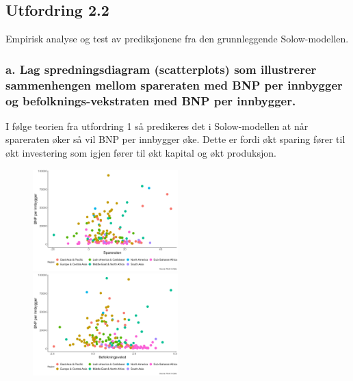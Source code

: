 \documentclass[
  12pt,
  a4paper,
  DIV=11,
  numbers=noendperiod]{scrartcl}
\begin{document}
\clearpage

\subsection{Utfordring 2.2}\label{utfordring-2.2}

Empirisk analyse og test av prediksjonene fra den grunnleggende
Solow-modellen.

\subsubsection{a. Lag spredningsdiagram (scatterplots) som illustrerer
sammenhengen mellom spareraten med BNP per innbygger og
befolknings-vekstraten med BNP per
innbygger.}\label{a.-lag-spredningsdiagram-scatterplots-som-illustrerer-sammenhengen-mellom-spareraten-med-bnp-per-innbygger-og-befolknings-vekstraten-med-bnp-per-innbygger.}

I følge teorien fra utfordring 1 så predikeres det i Solow-modellen at
når spareraten øker så vil BNP per innbygger øke. Dette er fordi økt
sparing fører til økt investering som igjen fører til økt kapital og økt
produksjon.

\begin{figure}
  \centering
  \includegraphics[width=0.5\textwidth]{dokumentobjekter/figurer/spareraten_bnp_per_innbygger.png}
  \label{fig:sparerate}
  \includegraphics[width=0.5\textwidth]{dokumentobjekter/figurer/befolkningsvekst_bnp_per_innbygger.png}
  \label{fig:befolkningsvekst}
  \vspace{-10mm}
\end{figure}
\end{document}
